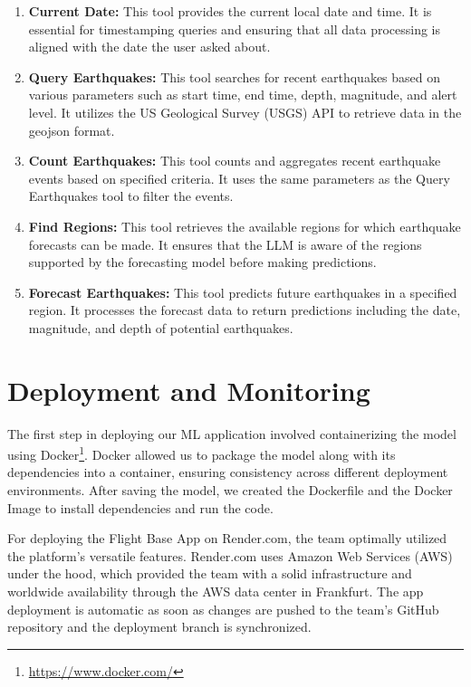 \begin{enumerate}
  \item \textbf{Current Date:} This tool provides the current
        local date and time. It is essential for timestamping queries
        and ensuring that all data processing is aligned with the
        date the user asked about.
  \item \textbf{Query Earthquakes:} This tool searches for
        recent earthquakes based on various parameters such as start
        time, end time, depth, magnitude, and alert level. It utilizes
        the US Geological Survey (USGS) API to retrieve data in the
        geojson format.
  \item \textbf{Count Earthquakes:} This tool counts and aggregates
        recent earthquake events based on specified criteria. It uses the
        same parameters as the Query Earthquakes tool to filter the events.
  \item \textbf{Find Regions:} This tool retrieves the available
        regions for which earthquake forecasts can be made. It ensures
        that the LLM is aware of the regions supported by the forecasting
        model before making predictions.
  \item \textbf{Forecast Earthquakes:} This tool predicts future
        earthquakes in a specified region. It processes the forecast data
        to return predictions including the date, magnitude, and depth of
        potential earthquakes.
\end{enumerate}

\section{Deployment and Monitoring}
The first step in deploying our ML application involved containerizing
the model using Docker\footnote{\url{https://www.docker.com/}}. Docker
allowed us to package the model along with its dependencies into a
container, ensuring consistency across different deployment environments.
After saving the model, we created the Dockerfile and the Docker Image to
install dependencies and run the code.

For deploying the Flight Base App on Render.com, the team optimally
utilized the platform's versatile features. Render.com uses
Amazon Web Services (AWS) under the hood, which provided the
team with a solid infrastructure and worldwide availability through
the AWS data center in Frankfurt. The app deployment is automatic as
soon as changes are pushed to the team's GitHub repository and the
deployment branch is synchronized.

